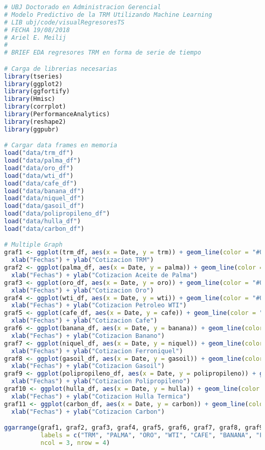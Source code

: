 \begin{lstlisting}[language=R]
# UBJ Doctorado en Administracion Gerencial
# Modelo Predictivo de la TRM Utilizando Machine Learning
# LIB ubj/code/visualRegresoresTS
# FECHA 19/08/2018
# Ariel E. Meilij
#
# BRIEF EDA regresores TRM en forma de serie de tiempo

# Carga de librerias necesarias
library(tseries)
library(ggplot2)
library(ggfortify)
library(Hmisc)
library(corrplot)
library(PerformanceAnalytics)
library(reshape2)
library(ggpubr)

# Cargar data frames en memoria
load("data/trm_df")
load("data/palma_df")
load("data/oro_df")
load("data/wti_df")
load("data/cafe_df")
load("data/banana_df")
load("data/niquel_df")
load("data/gasoil_df")
load("data/polipropileno_df")
load("data/hulla_df")
load("data/carbon_df")

# Multiple Graph
graf1 <- ggplot(trm_df, aes(x = Date, y = trm)) + geom_line(color = "#00AFBB", size = 1) +
  xlab("Fechas") + ylab("Cotizacion TRM")
graf2 <- ggplot(palma_df, aes(x = Date, y = palma)) + geom_line(color = "#00AFBB", size = 1) +
  xlab("Fechas") + ylab("Cotizacion Aceite de Palma")
graf3 <- ggplot(oro_df, aes(x = Date, y = oro)) + geom_line(color = "#00AFBB", size = 1) +
  xlab("Fechas") + ylab("Cotizacion Oro")
graf4 <- ggplot(wti_df, aes(x = Date, y = wti)) + geom_line(color = "#00AFBB", size = 1) +
  xlab("Fechas") + ylab("Cotizacion Petroleo WTI")
graf5 <- ggplot(cafe_df, aes(x = Date, y = cafe)) + geom_line(color = "#00AFBB", size = 1) +
  xlab("Fechas") + ylab("Cotizacion Cafe")
graf6 <- ggplot(banana_df, aes(x = Date, y = banana)) + geom_line(color = "#00AFBB", size = 1) +
  xlab("Fechas") + ylab("Cotizacion Banano")
graf7 <- ggplot(niquel_df, aes(x = Date, y = niquel)) + geom_line(color = "#00AFBB", size = 1) +
  xlab("Fechas") + ylab("Cotizacion Ferroniquel")
graf8 <- ggplot(gasoil_df, aes(x = Date, y = gasoil)) + geom_line(color = "#00AFBB", size = 1) +
  xlab("Fechas") + ylab("Cotizacion Gasoil")
graf9 <- ggplot(polipropileno_df, aes(x = Date, y = polipropileno)) + geom_line(color = "#00AFBB", size = 1) +
  xlab("Fechas") + ylab("Cotizacion Polipropileno")
graf10 <- ggplot(hulla_df, aes(x = Date, y = hulla)) + geom_line(color = "#00AFBB", size = 1) +
  xlab("Fechas") + ylab("Cotizacion Hulla Termica")
graf11 <- ggplot(carbon_df, aes(x = Date, y = carbon)) + geom_line(color = "#00AFBB", size = 1) +
  xlab("Fechas") + ylab("Cotizacion Carbon")

ggarrange(graf1, graf2, graf3, graf4, graf5, graf6, graf7, graf8, graf9, graf10, graf11 + rremove("x.text"),
          labels = c("TRM", "PALMA", "ORO", "WTI", "CAFE", "BANANA", "FERRONIQUEL", "GASOIL", "POLIPROPILENO", "HULLA TERMICA", "CARBON" ),
          ncol = 3, nrow = 4)
\end{lstlisting}

